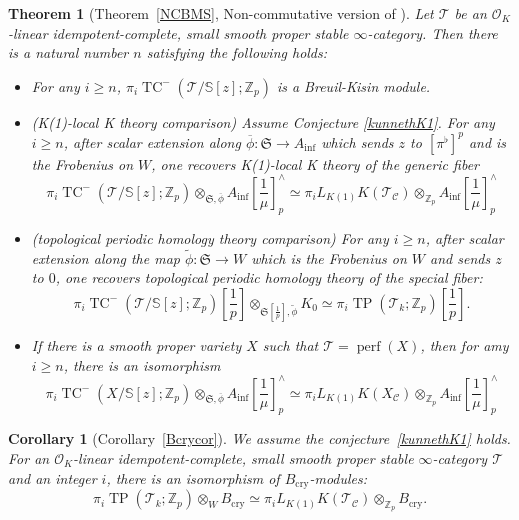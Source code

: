 \documentclass[11pt]{amsart}
\newcommand{\Z}{\mathbb{Z}}
\newcommand{\sO}{\mathcal{O}}
\newcommand{\sT}{\mathcal{T}}
\newcommand{\bS}{\mathbb{S}}
\newcommand{\perf}{\operatorname{perf}}
\newcommand{\LK}{{L_{K(1)}}}
\newcommand{\TP}{\operatorname{TP}}
\newcommand{\TCn}{\operatorname{TC}^{-}}
\newcommand{\ol}{\overline}
\newcommand{\Bcry}{B_{\operatorname{cry}}}
\newcommand{\Ainf}{A_{\operatorname{inf}}}
\newcommand{\Cu}{\mathcal{C}}
\newcommand{\mS}{\mathfrak{S}}
\newcounter{spec}
\newtheorem{thm}[lemma]{Theorem}
\newtheorem{cor}[lemma]{Corollary}
\theoremstyle{definition}
\theoremstyle{remark}
\numberwithin{equation}{section}
\begin{document}
\begin{thm}[{Theorem~\ref{NCBMS}}, {Non-commutative version of \cite{BMS2}}]\label{NCBMSintro}
  Let $\sT$ be an $\sO_K$-linear idempotent-complete, small smooth proper stable $\infty$-category. Then there is a natural number $n$ satisfying the following holds:
 \begin{itemize}
   \item[(1)] For any $i\geq n$, $\pi_i \TCn(\sT/\bS[z];\Z_p)$ is a Breuil-Kisin module.
   \item[(2)] (K(1)-local K theory comparison) Assume Conjecture \ref{kunnethK1}. For any $i\geq n$, after scalar extension along $\ol{\phi}:\mS\to \Ainf$ which sends $z$ to $[\pi^{\flat}]^p$ and is the Frobenius on $W$, one recovers K(1)-local K theory of the generic fiber
   \[
   \pi_i \TCn(\sT/\bS[z];\Z_p) \otimes_{\mS,\ol{\phi}} \Ainf[\frac{1}{\mu}]^{\wedge}_p \simeq \pi_i\LK K(\sT_{\Cu})\otimes_{\Z_p} \Ainf[\frac{1}{\mu}]^{\wedge}_p
   \]
   \item[(3)] (topological periodic homology theory comparison) For any $i\geq n$, after scalar extension along the map $\tilde{\phi}:\mS\to W$ which is the Frobenius on $W$ and sends $z$ to $0$, one recovers topological periodic homology theory of the special fiber:
  \[
   \pi_i \TCn(\sT/\bS[z];\Z_p)[\frac{1}{p}] \otimes_{\mS[\frac{1}{p}],\tilde{\phi}} K_0 \simeq \pi_i \TP(\sT_k;\Z_p)[\frac{1}{p}].
   \]
   \item[(4)] If there is a smooth proper variety $X$ such that $\sT=\perf(X)$, then for amy $i\geq n$, there is an isomorphism
   \[
    \pi_i \TCn(X/\bS[z];\Z_p) \otimes_{\mS,\ol{\phi}} \Ainf[\frac{1}{\mu}]^{\wedge}_p \simeq \pi_i\LK K(X_{\Cu})\otimes_{\Z_p} \Ainf[\frac{1}{\mu}]^{\wedge}_p
  \]
  \end{itemize}
\end{thm}
\begin{cor}[{Corollary~\ref{Bcrycor}}]\label{maincor}
We assume the conjecture~\ref{kunnethK1} holds. For an $\sO_K$-linear idempotent-complete, small smooth proper stable $\infty$-category $\sT$ and an integer $i$, there is an isomorphism of $\Bcry$-modules:
\[
\pi_i\TP(\sT_k;\Z_p)\otimes_W \Bcry \simeq \pi_i L_{K(1)}K(\sT_\Cu)\otimes_{\Z_p} \Bcry.
\]
\end{cor}
\end{document}
